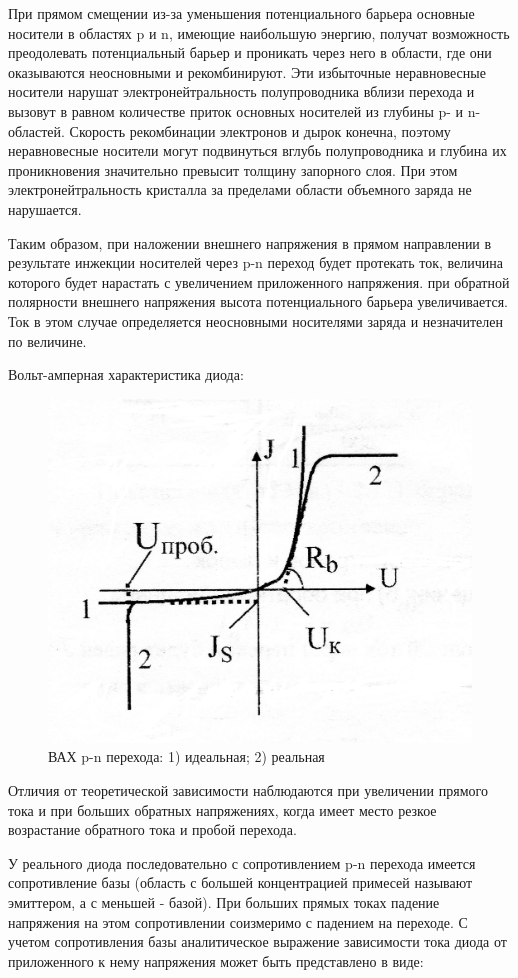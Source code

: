 При прямом смещении из-за уменьшения потенциального барьера основные носители в областях p и n, имеющие наибольшую энергию, получат возможность преодолевать потенциальный барьер и проникать через него в области, где они оказываются неосновными и рекомбинируют. Эти избыточные неравновесные носители нарушат электронейтральность полупроводника вблизи перехода и вызовут в равном количестве приток основных носителей из глубины p- и n-областей. Скорость рекомбинации электронов и дырок конечна, поэтому неравновесные носители могут подвинуться вглубь полупроводника и глубина их проникновения значительно превысит толщину запорного слоя. При этом электронейтральность кристалла за пределами области объемного заряда не нарушается. 

Таким образом, при наложении внешнего напряжения в прямом направлении в результате инжекции  носителей через p-n переход будет протекать ток, величина которого будет нарастать с увеличением приложенного напряжения. при обратной полярности внешнего напряжения высота потенциального барьера увеличивается. Ток в этом случае определяется неосновными носителями заряда и незначителен по величине.

Вольт-амперная характеристика диода:
\begin{figure}[h!]
	\centering
	\includegraphics[width=0.5\linewidth]{fig/fig2.jpg}
	\caption{ВАХ p-n перехода: 1) идеальная; 2) реальная}
	\label{fig:2}
\end{figure}

Отличия от теоретической зависимости наблюдаются при увеличении прямого тока и при больших обратных напряжениях, когда имеет место резкое возрастание обратного тока и пробой перехода. 

У реального диода последовательно с сопротивлением p-n перехода имеется сопротивление базы (область с большей концентрацией примесей называют эмиттером, а с меньшей - базой). При больших прямых токах падение напряжения на этом сопротивлении соизмеримо с падением на переходе. С учетом сопротивления базы аналитическое выражение зависимости тока диода от приложенного к нему напряжения может быть представлено в виде:

